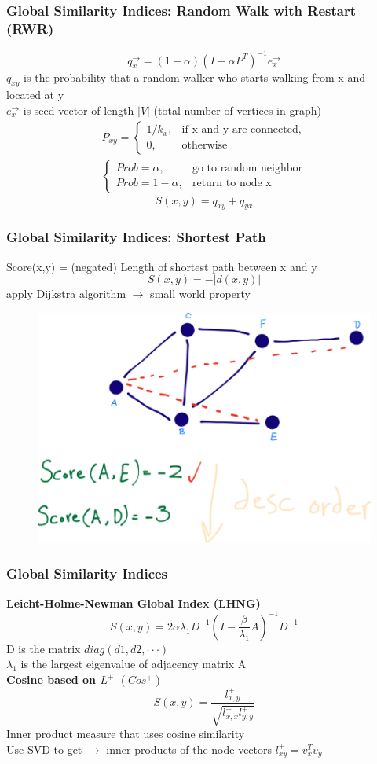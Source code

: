 \documentclass{beamer}
\begin{document}
\begin{frame}
  \frametitle{Global Similarity Indices: Random Walk with Restart (RWR)} 
    \[q_{x}^{\rightarrow} = (1 - \alpha)(I - \alpha P^{T})^{-1}e_{x}^{\rightarrow}\]
    $q_{xy}$ is the probability that a random walker who starts walking from x and located at y\\
    $e_{x}^{\rightarrow}$ is seed vector of length $|V|$ (total number of vertices in graph)
    \begin{align}
P_{xy} =
    \begin{cases}
      1/k_{x}, & \text{if x and y are connected,} \\
      0, & \text{otherwise}
    \end{cases}\\
\begin{cases}
      Prob = \alpha, & \text{go to random neighbor}\\
      Prob = 1 - \alpha, & \text{return to node x}
    \end{cases}
\end{align}
    \[S(x,y) = q_{xy} + q_{yx}\]

\end{frame}

\begin{frame}
  \frametitle{Global Similarity Indices: Shortest Path} 
    Score(x,y) = (negated) Length of shortest path between x and y
    \[S(x,y) = -|d(x,y)|\]
    apply Dijkstra algorithm $\rightarrow$ small world property
    
\begin{figure}
\centering
  \includegraphics[width=.6\linewidth]{graph-distance-graph.png}
  \label{fig:shortest_path}
\end{figure}
   
\end{frame}


\begin{frame}
  \frametitle{Global Similarity Indices} 
    \textbf{Leicht-Holme-Newman Global Index (LHNG)}
    \[S(x,y) = 2\alpha \lambda_{1}D^{-1}(I-\frac{\beta}{\lambda_{1}}A)^{-1}D^{-1}\]
    D is the matrix $diag(d1,d2,\cdot\cdot\cdot)$\\
    $\lambda_{1}$ is the largest eigenvalue of adjacency matrix A
    \\
    \textbf{Cosine based on $L^{+}$ $(Cos^{+})$}
    \[S(x,y) = \dfrac{l_{x,y}^{+}}{\sqrt{l_{x,x}^{+} l_{y,y}^{+}}}\]
    Inner product measure that uses cosine similarity\\
    Use SVD to get $\rightarrow$ inner products of the node vectors $l_{xy}^{+} = v_{x}^{T}v_{y}$
\end{frame}
\end{document}
